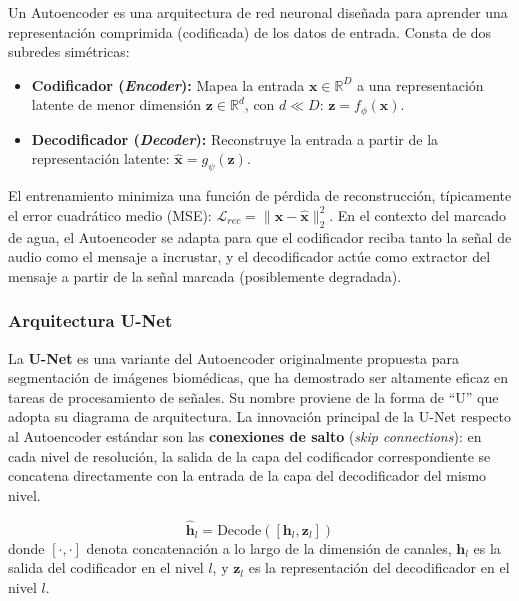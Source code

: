 Un Autoencoder es una arquitectura de red neuronal diseñada para aprender una representación comprimida (codificada) de los datos de entrada. Consta de dos subredes simétricas:

\begin{itemize}
    \item \textbf{Codificador (\textit{Encoder}):} Mapea la entrada $\mathbf{x} \in \mathbb{R}^D$ a una representación latente de menor dimensión $\mathbf{z} \in \mathbb{R}^d$, con $d \ll D$: $\mathbf{z} = f_\phi(\mathbf{x})$.

    \item \textbf{Decodificador (\textit{Decoder}):} Reconstruye la entrada a partir de la representación latente: $\hat{\mathbf{x}} = g_\psi(\mathbf{z})$.
\end{itemize}

El entrenamiento minimiza una función de pérdida de reconstrucción, típicamente el error cuadrático medio (MSE): $\mathcal{L}_{rec} = \|\mathbf{x} - \hat{\mathbf{x}}\|_2^2$. En el contexto del marcado de agua, el Autoencoder se adapta para que el codificador reciba tanto la señal de audio como el mensaje a incrustar, y el decodificador actúe como extractor del mensaje a partir de la señal marcada (posiblemente degradada).

\subsubsection{Arquitectura U-Net}

La \textbf{U-Net} \cite{ronneberger2015u} es una variante del Autoencoder originalmente propuesta para segmentación de imágenes biomédicas, que ha demostrado ser altamente eficaz en tareas de procesamiento de señales. Su nombre proviene de la forma de ``U'' que adopta su diagrama de arquitectura. La innovación principal de la U-Net respecto al Autoencoder estándar son las \textbf{conexiones de salto} (\textit{skip connections}): en cada nivel de resolución, la salida de la capa del codificador correspondiente se concatena directamente con la entrada de la capa del decodificador del mismo nivel.

\begin{equation}
    \hat{\mathbf{h}}_l = \text{Decode}([\mathbf{h}_l, \mathbf{z}_l])
\end{equation}
donde $[\cdot, \cdot]$ denota concatenación a lo largo de la dimensión de canales, $\mathbf{h}_l$ es la salida del codificador en el nivel $l$, y $\mathbf{z}_l$ es la representación del decodificador en el nivel $l$.

